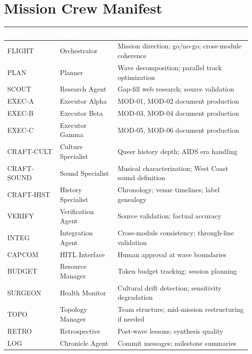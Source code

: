 \documentclass[11pt,letterpaper]{article}
\newcommand{\tableheader}[1]{\textbf{\sffamily\textcolor{white}{#1}}}
\begin{document}
\section{Mission Crew Manifest}

\begin{center}
\begin{tabularx}{\textwidth}{L{2cm}L{3cm}X}
\toprule
{}
\tableheader{Role} & \tableheader{Agent} & \tableheader{Primary Responsibility} \\
\midrule
FLIGHT & Orchestrator & Mission direction; go/no-go; cross-module coherence \\
PLAN & Planner & Wave decomposition; parallel track optimization \\
SCOUT & Research Agent & Gap-fill web research; source validation \\
EXEC-A & Executor Alpha & MOD-01, MOD-02 document production \\
EXEC-B & Executor Beta & MOD-03, MOD-04 document production \\
EXEC-C & Executor Gamma & MOD-05, MOD-06 document production \\
CRAFT-CULT & Culture Specialist & Queer history depth; AIDS era handling \\
CRAFT-SOUND & Sound Specialist & Musical characterization; West Coast sound definition \\
CRAFT-HIST & History Specialist & Chronology; venue timelines; label genealogy \\
VERIFY & Verification Agent & Source validation; factual accuracy \\
INTEG & Integration Agent & Cross-module consistency; through-line validation \\
CAPCOM & HITL Interface & Human approval at wave boundaries \\
BUDGET & Resource Manager & Token budget tracking; session planning \\
SURGEON & Health Monitor & Cultural drift detection; sensitivity degradation \\
TOPO & Topology Manager & Team structure; mid-mission restructuring if needed \\
RETRO & Retrospective & Post-wave lessons; synthesis quality \\
LOG & Chronicle Agent & Commit messages; milestone summaries \\
\bottomrule
\end{tabularx}
\end{center}
\end{document}
